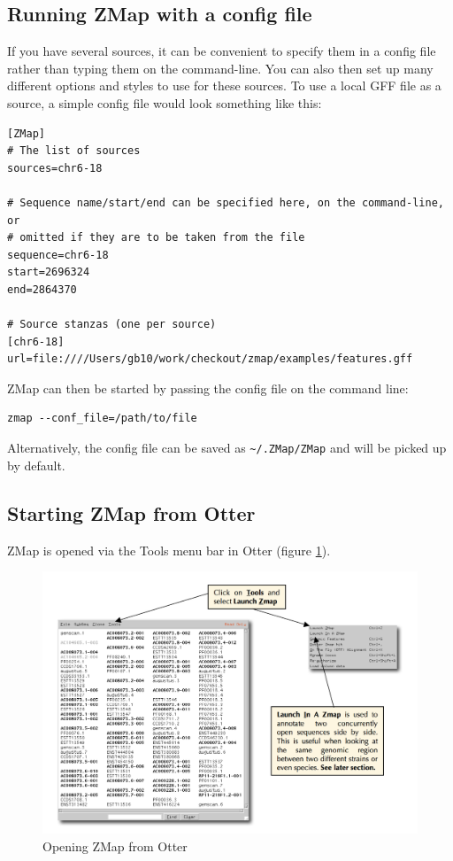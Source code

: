 \documentclass[letterpaper]{article}
\begin{document}
\subsection{Running ZMap with a config file}
If you have several sources, it can be convenient to specify them in a config file rather than typing them on the command-line. You can also then set up many different options and styles to use for these sources. To use a local GFF file as a source, a simple config file would look something like this:
\begin{lstlisting}
[ZMap]
# The list of sources
sources=chr6-18

# Sequence name/start/end can be specified here, on the command-line, or
# omitted if they are to be taken from the file
sequence=chr6-18
start=2696324
end=2864370

# Source stanzas (one per source)
[chr6-18]
url=file:////Users/gb10/work/checkout/zmap/examples/features.gff
\end{lstlisting}

ZMap can then be started by passing the config file on the command line:
\begin{lstlisting}
zmap --conf_file=/path/to/file
\end{lstlisting}

Alternatively, the config file can be saved as \lstinline{~/.ZMap/ZMap} and will be picked up by default.

\subsection{Starting ZMap from Otter}
ZMap is opened via the Tools menu bar in Otter (figure \ref{img_open_from_otterlace}).

\begin{figure}
\centering
\color[rgb]{0.30980393,0.5058824,0.7411765}
\includegraphics[width=15.231cm]{images/open_from_otterlace.png}
\caption{Opening ZMap from Otter}
\label{img_open_from_otterlace}
\end{figure}
\end{document}
